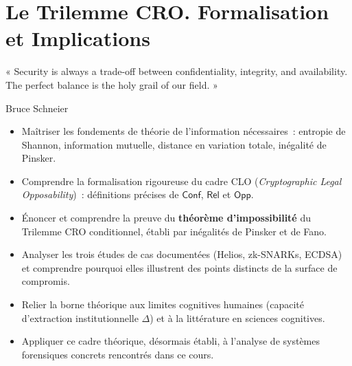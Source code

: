 
\chapter{Le Trilemme CRO. Formalisation et Implications}
\label{chap:CRO}

\epigraph{%
    « Security is always a trade-off between confidentiality, integrity,
    and availability. The perfect balance is the holy grail of our
    field. »%
}{Bruce Schneier}


\begin{boxobjectifs}
\begin{itemize}
    \item Maîtriser les fondements de théorie de l'information
          nécessaires~: entropie de Shannon, information mutuelle,
          distance en variation totale, inégalité de Pinsker.
    \item Comprendre la formalisation rigoureuse du cadre CLO
          (\textit{Cryptographic Legal Opposability})~: définitions
          précises de $\mathsf{Conf}$, $\mathsf{Rel}$ et $\mathsf{Opp}$.
    \item Énoncer et comprendre la preuve du \textbf{théorème
          d'impossibilité} du Trilemme CRO conditionnel, établi
          par inégalités de Pinsker et de Fano.
    \item Analyser les trois études de cas documentées (Helios,
          zk-SNARKs, ECDSA) et comprendre pourquoi elles illustrent
          des points distincts de la surface de compromis.
    \item Relier la borne théorique aux limites cognitives humaines
          (capacité d'extraction institutionnelle $\Delta$) et à la
          littérature en sciences cognitives.
    \item Appliquer ce cadre théorique, désormais établi, à l'analyse
          de systèmes forensiques concrets rencontrés dans ce cours.
\end{itemize}
\end{boxobjectifs}

